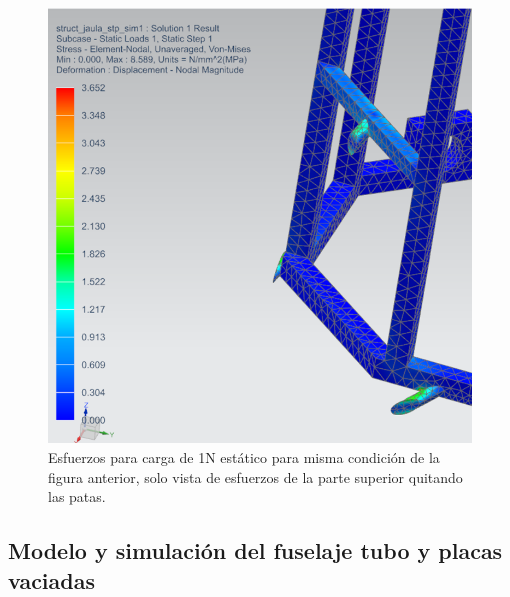 \begin{figure}[htb]
    \centering
    \includegraphics[height=0.25\pdfpageheight]{fig/fea/jaula2.png}
    \caption{Esfuerzos para carga de 1N estático para misma condición de la figura anterior, solo vista de esfuerzos de la parte superior quitando las patas.}
    \label{fig:fea/jaula2}
\end{figure}

\null\newpage
\clearpage

\subsection{Modelo y simulación del fuselaje tubo y placas vaciadas}

